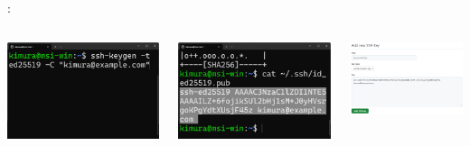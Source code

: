 \documentclass[aspectratio=169,dvipdfmx,cjk]{beamer}
\begin{document}
\begin{frame}{\insertsection \thesubsection: \insertsubsection}
\begin{columns}
\begin{column}{0.25\textwidth}
      \includegraphics[width=1.0\linewidth]{fig/ssh-keygen.png}
    \end{column}
    \begin{column}{0.25\textwidth}
      \includegraphics[width=1.0\linewidth]{fig/cat.png}
    \end{column}
    \begin{column}{0.25\textwidth}
      \includegraphics[width=1.0\linewidth]{fig/add-sshkey.png}
    \end{column}
  \end{columns}
\end{frame}
\end{document}
